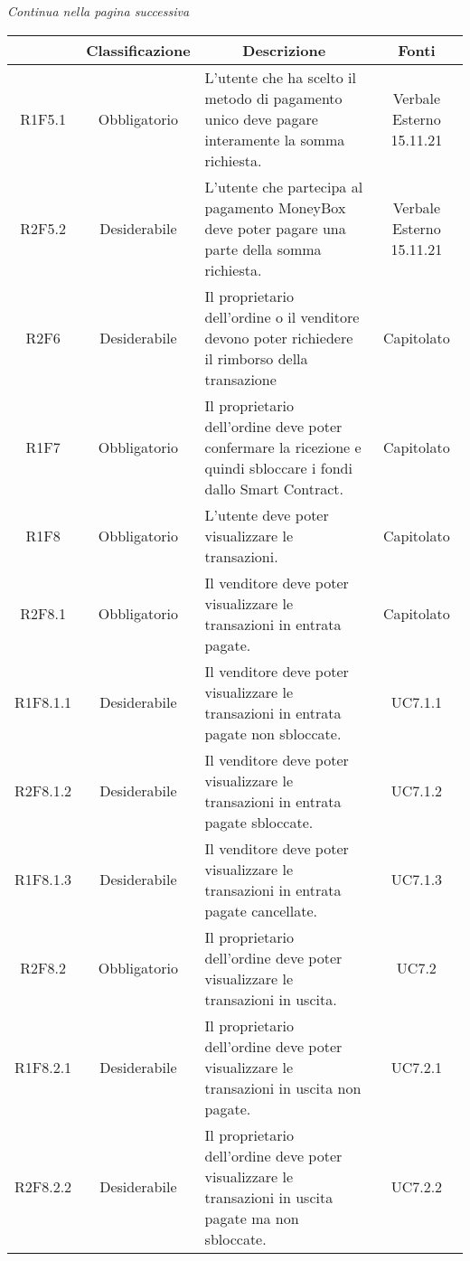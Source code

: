 \begin{center}
    \textit{\small Continua nella pagina successiva}
\end{center}
\begin{table}[H]
    \centering
    \renewcommand{\arraystretch}{1.8}
    \begin{tabular}{c | c | p{6cm} | c}
        \rowcolor[HTML]{125E28} 
        \multicolumn{1}{c}{\color[HTML]{FFFFFF} \textbf{Codice}} & 
		\multicolumn{1}{c}{\color[HTML]{FFFFFF} \textbf{Classificazione}} & 
		\multicolumn{1}{c}{\color[HTML]{FFFFFF} \textbf{Descrizione}} & 
		\multicolumn{1}{c}{\color[HTML]{FFFFFF} \textbf{Fonti}} \\
        \hline
        R1F5.1 & Obbligatorio & L'utente che ha scelto il metodo di pagamento unico deve pagare interamente la somma richiesta. & Verbale Esterno 15.11.21 \\
        R2F5.2 & Desiderabile & L'utente che partecipa al pagamento MoneyBox deve poter pagare una parte della somma richiesta. & Verbale Esterno 15.11.21 \\
        R2F6 & Desiderabile & Il proprietario dell'ordine o il venditore devono poter richiedere il rimborso della transazione  & Capitolato \\
        R1F7 & Obbligatorio & Il proprietario dell'ordine deve poter confermare la ricezione e quindi sbloccare i fondi dallo Smart Contract. & Capitolato \\
        R1F8 & Obbligatorio & L'utente deve poter visualizzare le transazioni. & Capitolato \\
        R2F8.1 & Obbligatorio & Il venditore deve poter visualizzare le transazioni in entrata pagate. & Capitolato \\
        R1F8.1.1 & Desiderabile & Il venditore deve poter visualizzare le transazioni in entrata pagate non sbloccate. & UC7.1.1 \\
        R2F8.1.2 & Desiderabile & Il venditore deve poter visualizzare le transazioni in entrata pagate sbloccate. & UC7.1.2 \\
        R1F8.1.3 & Desiderabile & Il venditore deve poter visualizzare le transazioni in entrata pagate cancellate. & UC7.1.3 \\
        R2F8.2 & Obbligatorio & Il proprietario dell'ordine deve poter visualizzare le transazioni in uscita. & UC7.2 \\
        R1F8.2.1 & Desiderabile & Il proprietario dell'ordine deve poter visualizzare le transazioni in uscita non pagate. & UC7.2.1 \\
        R2F8.2.2 & Desiderabile & Il proprietario dell'ordine deve poter visualizzare le transazioni in uscita pagate ma non sbloccate. & UC7.2.2 \\
    \end{tabular}
\end{table}
